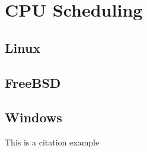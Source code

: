 \documentclass[onecolumn, draftclsnofoot,10pt, compsoc]{IEEEtran}
\begin{document}
\section*{CPU Scheduling}
\subsection*{Linux}


\subsection*{FreeBSD}


\subsection*{Windows}
This is a citation example \cite[Pg 408]{mark1}




\end{document}

